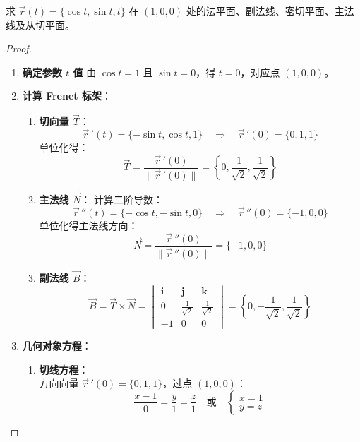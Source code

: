 \documentclass[lang=cn,10pt,thmcnt=section]{elegantbook}
\begin{document}
\begin{example}
	求 $\vec{r}(t) = \{\cos t, \sin t, t\}$ 在 $(1, 0, 0)$ 处的法平面、副法线、密切平面、主法线及从切平面。
\end{example}
\begin{proof}
	
	
	\begin{enumerate}
		\item \textbf{确定参数 $t$ 值}  
		由 $\cos t = 1$ 且 $\sin t = 0$，得 $t = 0$，对应点 $(1, 0, 0)$。
		
		\item \textbf{计算 Frenet 标架}：
		\begin{enumerate}
			\item \textbf{切向量 $\vec{T}$}：
			\[
				\vec{r}\,'(t) = \{-\sin t, \cos t, 1\} \quad \Rightarrow \quad 
				\vec{r}\,'(0) = \{0, 1, 1\}
			\]
			单位化得：
			\[
				\vec{T} = \frac{\vec{r}\,'(0)}{\|\vec{r}\,'(0)\|} = \left\{0, \frac{1}{\sqrt{2}}, \frac{1}{\sqrt{2}}\right\}
			\]
			
			\item \textbf{主法线 $\vec{N}$}：
			计算二阶导数：
			\[
				\vec{r}\,''(t) = \{-\cos t, -\sin t, 0\} \quad \Rightarrow \quad 
				\vec{r}\,''(0) = \{-1, 0, 0\}
			\]
			单位化得主法线方向：
			\[
				\vec{N} = \frac{\vec{r}\,''(0)}{\|\vec{r}\,''(0)\|} = \{-1, 0, 0\}
			\]
			
			\item \textbf{副法线 $\vec{B}$}：
			\[
				\vec{B} = \vec{T} \times \vec{N} = \begin{vmatrix}
					\mathbf{i} & \mathbf{j} & \mathbf{k} \\
					0 & \frac{1}{\sqrt{2}} & \frac{1}{\sqrt{2}} \\
					-1 & 0 & 0
				\end{vmatrix} = \left\{0, -\frac{1}{\sqrt{2}}, \frac{1}{\sqrt{2}}\right\}
			\]
		\end{enumerate}
		
		\item \textbf{几何对象方程}：
		\begin{enumerate}
			\item \textbf{切线方程}：\\
			方向向量 $\vec{r}\,'(0) = \{0, 1, 1\}$，过点 $(1, 0, 0)$：
			\[
				\frac{x-1}{0} = \frac{y}{1} = \frac{z}{1} \quad \text{或} \quad 
				\begin{cases} 
					x = 1 \\ 
					y = z 
				\end{cases}
			\]
			

\end{enumerate}
\end{enumerate}
\end{proof}
\end{document}
